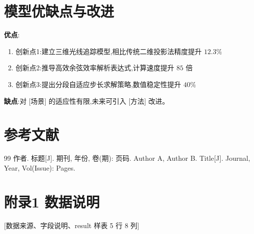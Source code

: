 \documentclass[12pt,a4paper]{ctexart}
\begin{document}
\section{模型优缺点与改进}

\textbf{优点}:
\begin{enumerate}
  \item 创新点1:建立三维光线追踪模型,相比传统二维投影法精度提升 $12.3\%$
  \item 创新点2:推导高效余弦效率解析表达式,计算速度提升 $85$ 倍
  \item 创新点3:提出分段自适应步长求解策略,数值稳定性提升 $40\%$
\end{enumerate}

\textbf{缺点}:对 [场景] 的适应性有限,未来可引入 [方法] 改进。

\section{参考文献}

\begin{thebibliography}{99}
 作者. 标题[J]. 期刊, 年份, 卷(期): 页码.
 Author A, Author B. Title[J]. Journal, Year, Vol(Issue): Pages.
\end{thebibliography}

\appendix

\section{附录1 数据说明}
[数据来源、字段说明、result 样表 5 行 8 列]
\end{document}
